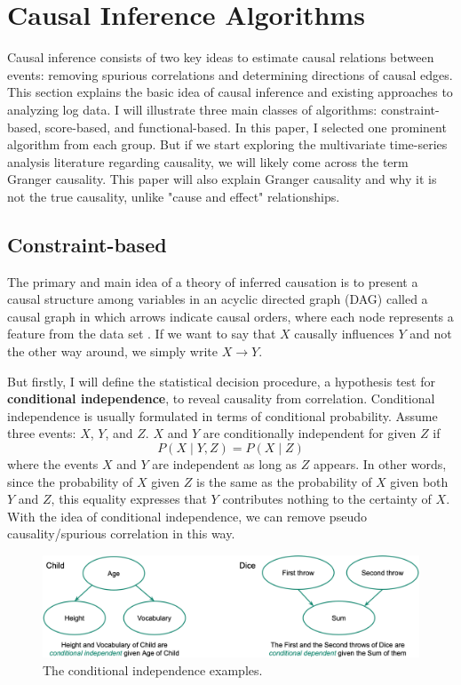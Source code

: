 \section{Causal Inference Algorithms}
\label{sec:5}
Causal inference consists of two key ideas to estimate causal relations between events: removing spurious correlations and determining directions of causal edges. This section explains the basic idea of causal inference and existing approaches to analyzing log data. I will illustrate three main classes of algorithms: constraint-based, score-based, and functional-based. In this paper, I selected one prominent algorithm from each group. But if we start exploring the multivariate time-series analysis literature regarding causality, we will likely come across the term Granger causality. This paper will also explain Granger causality and why it is not the true causality, unlike "cause and effect" relationships.
\subsection{Constraint-based}
The primary and main idea of a theory of inferred causation is to present a causal structure among variables in an acyclic directed graph (DAG) called a causal graph in which arrows indicate causal orders, where each node represents a feature from the data set \cite{pearl2009causality}. If we want to say that $X$ causally influences $Y$ and not the other way around, we simply write $X \rightarrow Y$. \newline

But firstly, I will define the statistical decision procedure, a hypothesis test for \textbf{conditional independence}, to reveal causality from correlation. Conditional independence is usually formulated in terms of conditional probability. Assume three events: $X$, $Y$, and $Z$. $X$ and $Y$ are conditionally independent for given $Z$ if
\begin{equation}
P(X \mid Y, Z)=P(X \mid Z)
\end{equation}
where the events $X$ and $Y$ are independent as long as $Z$ appears. In other words, since the probability of $X$ given $Z$ is the same as the probability of $X$ given both $Y$ and $Z$, this equality expresses that $Y$ contributes nothing to the certainty of $X$. With the idea of conditional independence, we can remove pseudo causality/spurious correlation in this way. \newline
\begin{figure}[ht]
\centering
    \label{fig:ci-example}
    \includegraphics[width=\textwidth]{figures/ci_example.png}
    \caption{The conditional independence examples.}
\end{figure}

